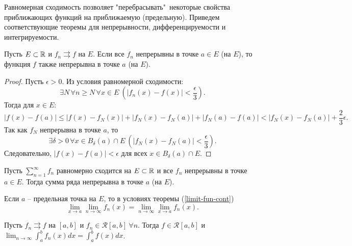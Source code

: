 Равномерная сходимость позволяет "перебрасывать"\ некоторые свойства приближающих функций на приближаемую (предельную). Приведем соответствующие теоремы для непрерывности, дифференцируемости и интегрируемости.

\begin{theorem}
    \label{limit-fun-cont}
    Пусть $E \subset \mathbb{R}$ и $f_{n} \rightrightarrows f$ на $E$. Если все $f_{n}$ непрерывны в точке $a \in E$ (на $E$), то функция $f$ также непрерывна в точке $a$ (на $E$).
\end{theorem}

\begin{proof}
    Пусть $\epsilon > 0$. Из условия равномерной сходимости:
    \[\exists N \, \forall n \ge N \, \forall x \in E \ \left(|f_n(x) - f(x)| < \frac{\epsilon}{3}\right).\]
    Тогда для $x \in E$:
    \[|f(x) - f(a)| \le |f(x) - f_N(x)| + |f_N(x) - f_N(a)| + |f_N(a) - f(a)| < |f_N(x) - f_N(a)| + \frac{2}{3}\epsilon.\]
    Так как $f_N$ непрерывна в точке $a$, то
    \[\exists \delta > 0 \, \forall x \in B_\delta(a) \cap E \ \left(|f_N(x) - f_N(a)| < \frac{\epsilon}{3}\right).\]
    Следовательно, $|f(x) - f(a)| < \epsilon$ для всех $x \in B_\delta(a) \cap E$.
\end{proof}

\begin{corollary}
    \label{ser-sum-continuity}
    Пусть $\sum_{n = 1}^{\infty}f_{n}$ равномерно сходится на $E \subset \mathbb{R}$ и все $f_{n}$ непрерывны в точке $a \in E$. Тогда сумма ряда непрерывна в точке $a$ (на $E$).
\end{corollary}

\begin{note}
    Если $a$ -- предельная точка на $E$, то в условиях теоремы (\ref{limit-fun-cont})
    \[\lim_{x \to a}\lim_{n \to \infty}f_{n}(x) = \lim_{n \to \infty}\lim_{x \to a}f_{n}(x).\]
\end{note}

\begin{theorem}
    \label{limit-int}
    Пусть $f_{n} \rightrightarrows f$ на $[a, b]$ и $f_{n} \in \mathcal{R}[a, b] \ \forall n$. Тогда $f \in \mathcal{R}[a, b]$ и $\lim_{n \to \infty}\int_{a}^{b} f_{n}(x) dx = \int_{a}^{b} f(x) dx$.
\end{theorem}

